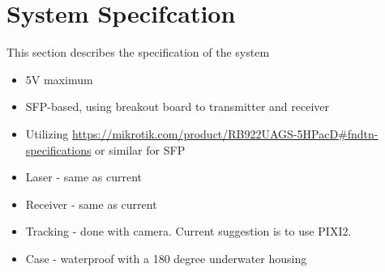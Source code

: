 \section{System Specifcation}
This section describes the specification of the system

\begin{itemize}
\item{5V maximum}
\item{\ac{SFP}-based, using breakout board to transmitter and receiver}
\item{Utilizing
	\url{https://mikrotik.com/product/RB922UAGS-5HPacD#fndtn-specifications}
	or similar for SFP}
\item{Laser - same as current}
\item{Receiver - same as current}
\item{Tracking - done with camera. Current suggestion is to use PIXI2.}
\item{Case - waterproof with a 180 degree underwater housing}
\end{itemize}
